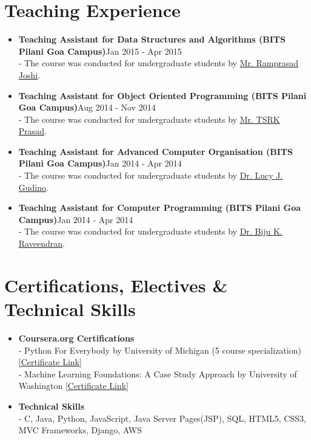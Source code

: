 \documentclass{article}
\begin{document}
\section*{Teaching Experience}
\begin{itemize}
    \item \textbf{Teaching Assistant for Data Structures and Algorithms (BITS Pilani Goa Campus)}{\hfill Jan 2015 - Apr 2015}\\
    - The course was conducted for undergraduate students by \href{http://www.bits-pilani.ac.in/goa/rsj/profile}{Mr. Ramprasad Joshi}.
    
    \item \textbf{Teaching Assistant for Object Oriented Programming (BITS Pilani Goa Campus)}{\hfill Aug 2014 - Nov 2014}\\
    - The course was conducted for undergraduate students by \href{http://universe.bits-pilani.ac.in/goa/tsrkp/Profile}{Mr. TSRK Prasad}.
    
    \item \textbf{Teaching Assistant for Advanced Computer Organisation (BITS Pilani Goa Campus)}{\hfill Jan 2014 - Apr 2014}\\
    - The course was conducted for undergraduate students by \href{http://www.bits-pilani.ac.in/goa/lucy/profile}{Dr. Lucy J. Gudino}.
    
    \item \textbf{Teaching Assistant for Computer Programming (BITS Pilani Goa Campus)}{\hfill Jan 2014 - Apr 2014}\\
    - The course was conducted for undergraduate students by \href{http://universe.bits-pilani.ac.in/goa/biju/profile}{Dr. Biju K. Raveendran}.
\end{itemize}


\section*{Certifications, Electives \& Technical Skills}
\begin{itemize}
    \item \textbf{Coursera.org Certifications}\\
    - Python For Everybody by University of Michigan (5 course specialization) \href{https://www.coursera.org/account/accomplishments/specialization/2B5PCJGZ9WEE}{[Certificate Link]}\\
    - Machine Learning Foundations: A Case Study Approach by University of Washington \href{https://www.coursera.org/account/accomplishments/certificate/NDVXWMCYKX9N}{[Certificate Link]}
    
    \item \textbf{Technical Skills}\\
    - C, Java, Python, JavaScript, Java Server Pages(JSP), SQL, HTML5, CSS3, MVC Frameworks, Django, AWS
\end{itemize}
\end{document}
